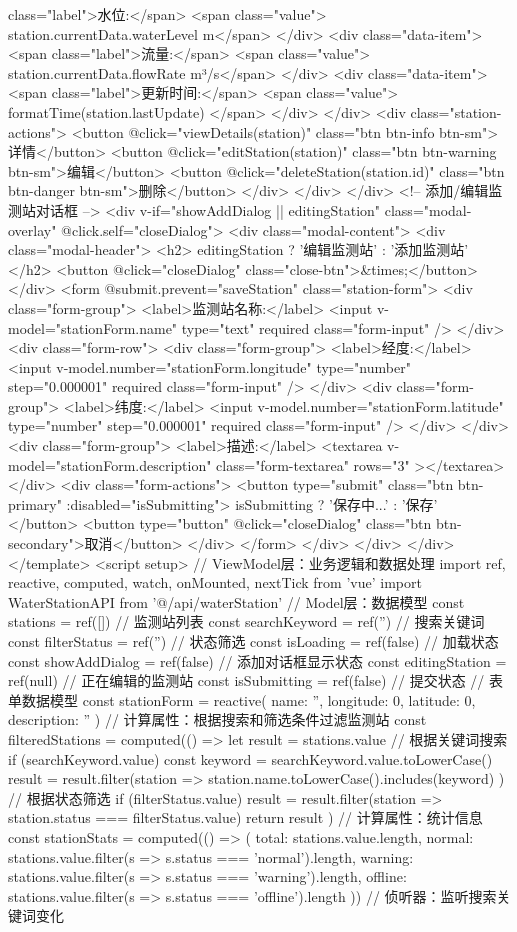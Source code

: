 {{{{{class="label">水位:</span> <span class="value">{{ station.currentData.waterLevel }} m</span> </div> <div class="data-item"> <span class="label">流量:</span> <span class="value">{{ station.currentData.flowRate }} m³/s</span> </div> <div class="data-item"> <span class="label">更新时间:</span> <span class="value">{{ formatTime(station.lastUpdate) }}</span> </div> </div> <div class="station-actions"> <button @click="viewDetails(station)" class="btn btn-info btn-sm">详情</button> <button @click="editStation(station)" class="btn btn-warning btn-sm">编辑</button> <button @click="deleteStation(station.id)" class="btn btn-danger btn-sm">删除</button> </div> </div> </div> <!-- 添加/编辑监测站对话框 --> <div v-if="showAddDialog || editingStation" class="modal-overlay" @click.self="closeDialog"> <div class="modal-content"> <div class="modal-header"> <h2>{{ editingStation ? '编辑监测站' : '添加监测站' }}</h2> <button @click="closeDialog" class="close-btn">&times;</button> </div> <form @submit.prevent="saveStation" class="station-form"> <div class="form-group"> <label>监测站名称:</label> <input v-model="stationForm.name" type="text" required class="form-input" /> </div> <div class="form-row"> <div class="form-group"> <label>经度:</label> <input v-model.number="stationForm.longitude" type="number" step="0.000001" required class="form-input" /> </div> <div class="form-group"> <label>纬度:</label> <input v-model.number="stationForm.latitude" type="number" step="0.000001" required class="form-input" /> </div> </div> <div class="form-group"> <label>描述:</label> <textarea v-model="stationForm.description" class="form-textarea" rows="3" ></textarea> </div> <div class="form-actions"> <button type="submit" class="btn btn-primary" :disabled="isSubmitting"> {{ isSubmitting ? '保存中...' : '保存' }} </button> <button type="button" @click="closeDialog" class="btn btn-secondary">取消</button> </div> </form> </div> </div> </div> </template> <script setup> // ViewModel层：业务逻辑和数据处理 import { ref, reactive, computed, watch, onMounted, nextTick } from 'vue' import { WaterStationAPI } from '@/api/waterStation' // Model层：数据模型 const stations = ref([]) // 监测站列表 const searchKeyword = ref('') // 搜索关键词 const filterStatus = ref('') // 状态筛选 const isLoading = ref(false) // 加载状态 const showAddDialog = ref(false) // 添加对话框显示状态 const editingStation = ref(null) // 正在编辑的监测站 const isSubmitting = ref(false) // 提交状态 // 表单数据模型 const stationForm = reactive({ name: '', longitude: 0, latitude: 0, description: '' }) // 计算属性：根据搜索和筛选条件过滤监测站 const filteredStations = computed(() => { let result = stations.value // 根据关键词搜索 if (searchKeyword.value) { const keyword = searchKeyword.value.toLowerCase() result = result.filter(station => station.name.toLowerCase().includes(keyword) ) } // 根据状态筛选 if (filterStatus.value) { result = result.filter(station => station.status === filterStatus.value) } return result }) // 计算属性：统计信息 const stationStats = computed(() => ({ total: stations.value.length, normal: stations.value.filter(s => s.status === 'normal').length, warning: stations.value.filter(s => s.status === 'warning').length, offline: stations.value.filter(s => s.status === 'offline').length })) // 侦听器：监听搜索关键词变化 }}}}}
